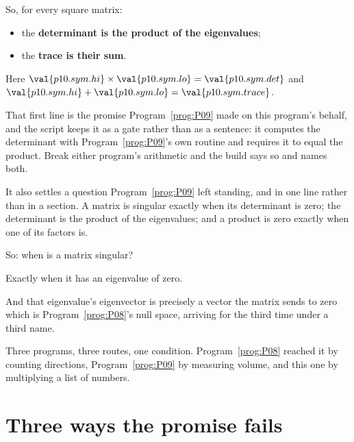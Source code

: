 \begin{fr}
So, for every square matrix:

\begin{itemize}
\item the \textbf{determinant is the product of the eigenvalues};
\item the \textbf{trace is their sum}.
\end{itemize}

Here $\val{p10.sym.hi} \times \val{p10.sym.lo} = \val{p10.sym.det}$ and
$\val{p10.sym.hi} + \val{p10.sym.lo} = \val{p10.sym.trace}$.

That first line is the promise Program~\ref{prog:P09} made on this program's
behalf, and the script keeps it as a gate rather than as a sentence: it
computes the determinant with Program~\ref{prog:P09}'s own routine and requires
it to equal the product. Break either program's arithmetic and the build says
so and names both.

It also settles a question Program~\ref{prog:P09} left standing, and in one
line rather than in a section. A matrix is singular exactly when its
determinant is zero; the determinant is the product of the eigenvalues; and a
product is zero exactly when one of its factors is.

So: when is a matrix singular?
\dotline
\nextframe
\end{fr}

\begin{fr}
\begin{ansblock}
Exactly when it has an eigenvalue of zero.
\end{ansblock}

And that eigenvalue's eigenvector is precisely a vector the matrix sends to
zero \dash{} which is Program~\ref{prog:P08}'s null space, arriving for the
third time under a third name.

Three programs, three routes, one condition. Program~\ref{prog:P08} reached it
by counting directions, Program~\ref{prog:P09} by measuring volume, and this
one by multiplying a list of numbers.
\end{fr}

\section{Three ways the promise fails}
\label{sec:P10-failures}

